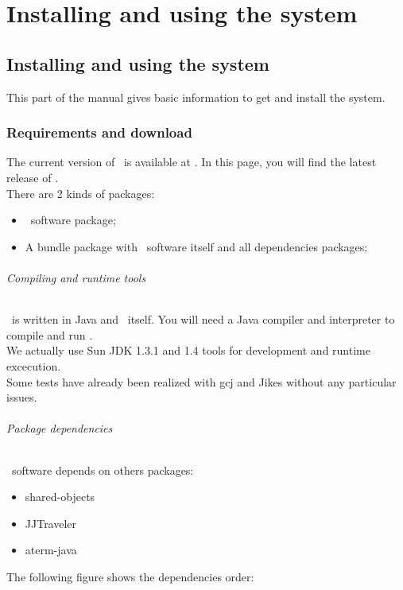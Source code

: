 \part{Installing and using the system}
\chapter{Installing and using the system}
This part of the manual gives basic information to get and install the
system.

\section{Requirements and download}
The current version of \TOM\ is available at .
In this page, you will find the latest release of \TOM.
\\There are 2 kinds of packages:
\begin{itemize}
\item \TOM\ software package;
\item A bundle package with \TOM\ software itself and all dependencies
  packages;
\end{itemize}

\paragraph{Compiling and runtime tools}
\TOM\ is written in Java and \TOM\ itself. You will need a Java
compiler and interpreter to compile and run \TOM. 
\\We actually use Sun JDK 1.3.1 and 1.4 tools for development and runtime
excecution.
\\Some tests have already been realized with gcj
and Jikes without any particular issues.

\paragraph{Package dependencies}
\TOM\ software depends on others packages:
\begin{itemize}
\item shared-objects
\item JJTraveler
\item aterm-java
\end{itemize}
The following figure shows the dependencies order:

